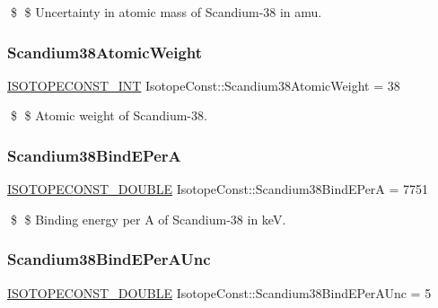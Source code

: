 \$ \$ Uncertainty in atomic mass of Scandium-\/38 in amu. \mbox{\label{group___isotope_const-_scandium-_sc38_ga6298b048abe1a24172d0d1f7b8e350dd}} 
\subsubsection{\texorpdfstring{Scandium38\+Atomic\+Weight}{Scandium38AtomicWeight}}
{\footnotesize\ttfamily \mbox{\hyperlink{group___isotope_const-_macros_ga5f18360b3e99483a35c32d789e62621c}{I\+S\+O\+T\+O\+P\+E\+C\+O\+N\+S\+T\+\_\+\+I\+NT}} Isotope\+Const\+::\+Scandium38\+Atomic\+Weight = 38}

\$ \$ Atomic weight of Scandium-\/38. \mbox{\label{group___isotope_const-_scandium-_sc38_ga99d56a85928f3fceea1bb95413766a2a}} 
\subsubsection{\texorpdfstring{Scandium38\+Bind\+E\+PerA}{Scandium38BindEPerA}}
{\footnotesize\ttfamily \mbox{\hyperlink{group___isotope_const-_macros_ga8f45a7272ce02c0b4c65c44636ed719a}{I\+S\+O\+T\+O\+P\+E\+C\+O\+N\+S\+T\+\_\+\+D\+O\+U\+B\+LE}} Isotope\+Const\+::\+Scandium38\+Bind\+E\+PerA = 7751}

\$ \$ Binding energy per A of Scandium-\/38 in keV. \mbox{\label{group___isotope_const-_scandium-_sc38_ga272fc6c5b8a545baf3f9454b09401d65}} 
\subsubsection{\texorpdfstring{Scandium38\+Bind\+E\+Per\+A\+Unc}{Scandium38BindEPerAUnc}}
{\footnotesize\ttfamily \mbox{\hyperlink{group___isotope_const-_macros_ga8f45a7272ce02c0b4c65c44636ed719a}{I\+S\+O\+T\+O\+P\+E\+C\+O\+N\+S\+T\+\_\+\+D\+O\+U\+B\+LE}} Isotope\+Const\+::\+Scandium38\+Bind\+E\+Per\+A\+Unc = 5}

